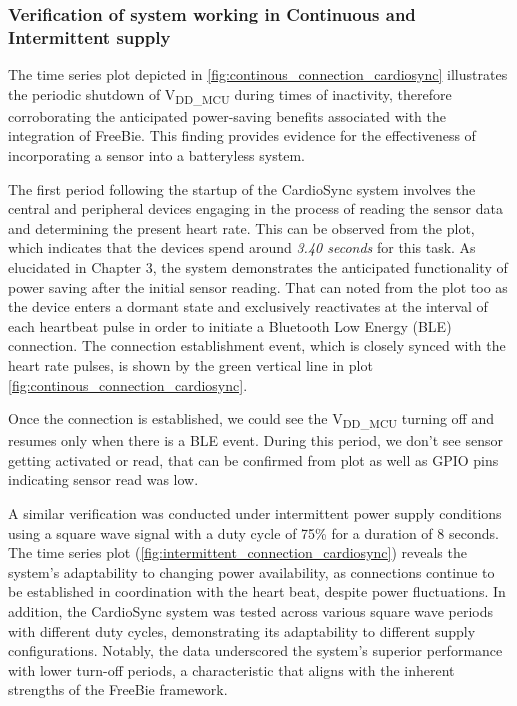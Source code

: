 \subsubsection{Verification of system working in Continuous and Intermittent supply}
The time series plot depicted in \autoref{fig:continous_connection_cardiosync} illustrates the periodic shutdown of V\textsubscript{DD\_MCU} during times of inactivity, therefore corroborating the anticipated power-saving benefits associated with the integration of FreeBie. This finding provides evidence for the effectiveness of incorporating a sensor into a batteryless system. 

\noindent The first period following the startup of the CardioSync system involves the central and peripheral devices engaging in the process of reading the sensor data and determining the present heart rate. This can be observed from the plot, which indicates that the devices spend around \textit{3.40 seconds} for this task. As elucidated in Chapter 3, the system demonstrates the anticipated functionality of power saving after the initial sensor reading. That can noted from the plot too as the device enters a dormant state and exclusively reactivates at the interval of each heartbeat pulse in order to initiate a Bluetooth Low Energy (BLE) connection. The connection establishment event, which is closely synced with the heart rate pulses, is shown by the green vertical line in plot \ref{fig:continous_connection_cardiosync}.

\noindent Once the connection is established, we could see the V\textsubscript{DD\_MCU} turning off and resumes only when there is a BLE event. During this period, we don't see sensor getting activated or read, that can be confirmed from plot as well as GPIO pins indicating sensor read was low.

\noindent A similar verification was conducted under intermittent power supply conditions using a square wave signal with a duty cycle of 75\% for a duration of 8 seconds. The time series plot (\autoref{fig:intermittent_connection_cardiosync}) reveals the system's adaptability to changing power availability, as connections continue to be established in coordination with the heart beat, despite power fluctuations. In addition, the CardioSync system was tested across various square wave periods with different duty cycles, demonstrating its adaptability to different supply configurations. Notably, the data underscored the system's superior performance with lower turn-off periods, a characteristic that aligns with the inherent strengths of the FreeBie framework.


